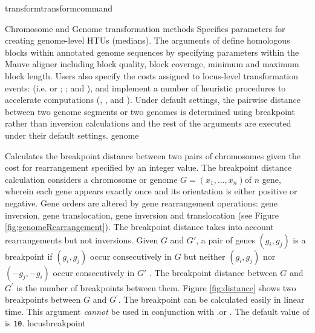 \begin{command}{transform}{transformcommand}
\begin{arguments}
\begin{argumentgroup}{Chromosome and Genome transformation methods}
                {Specifies parameters for creating genome-level HTUs (medians). 
                The arguments of  define 
                homologous blocks within annotated genome sequences by
                specifying parameters within the Mauve aligner \cite{darlingetal2004} 
                including block quality, block coverage, minimum and maximum block
                 length. Users also specify the costs assigned to locus-level transformation 
                 events: (i.e.   or 
                ; ; and 
                 ), and implement a number of heuristic 
                procedures to accelerate computations (, 
                , and ).  
                Under default settings, the pairwise distance between two genome 
                segments or two genomes is determined using breakpoint rather 
                than inversion calculations and the rest of the arguments are executed 
                under their default settings.}
                {genome}

                {Calculates the breakpoint distance \cite{blanchetteetal1997}
                between two pairs of chromosomes given the cost for rearrangement
                specified by an integer value.  The breakpoint distance calculation considers
                a chromosome or genome $G = (x_1, \ldots, x_n)$of $n$ gene, wherein each
                gene appears exactly once and its orientation is either positive or negative.  Gene
                orders are altered by gene rearrangement operations: gene inversion, gene translocation,
                gene inversion and translocation (see Figure \ref{fig:genomeRearrangement}).  
                The breakpoint distance takes into account rearrangements but not inversions.
                Given $G$ and $G'$, a pair of genes $(g_i, g_j)$ is a breakpoint if $(g_i, g_j)$ occur 
                consecutively in $G$ but neither $(g_i, g_j)$ nor $(-g_j, -g_i)$ occur
                consecutively in $G'$  \cite{sankoffandblanchette1998}.  The breakpoint distance between $G$
		        and $G^\prime$ is the number of breakpoints between them.  Figure \ref{fig:distance} 
                shows two breakpoints between $G$ and $G^\prime$. The breakpoint can be calculated 
                easily in linear time.  This argument \emph{cannot} be used in
                conjunction with .or . The default
                value of  is \texttt{10}.} 
                {locusbreakpoint} 
            

\end{argumentgroup}
\end{arguments}
\end{command}

